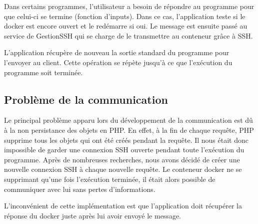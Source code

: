 \par Dans certains programmes, l'utilisateur a besoin de répondre au programme pour que celui-ci se termine (fonction d'inputs). Dans ce cas, l'application teste si le docker est encore ouvert et le redémarre si oui. Le message est ensuite passé au service de GestionSSH qui se charge de le transmettre au conteneur grâce à SSH.

\par L'application récupère de nouveau la sortie standard du programme pour l'envoyer au client. Cette opération se répète jusqu'à ce que l'exécution du programme soit terminée.

\subsection{Problème de la communication}

\par Le principal problème apparu lors du développement de la communication est dû à la non persistance des objets en PHP. En effet, à la fin de chaque requête, PHP supprime tous les objets qui ont été créés pendant la requête. Il nous était donc impossible de garder une connexion SSH ouverte pendant toute l'exécution du programme. Après de nombreuses recherches, nous avons décidé de créer une nouvelle connexion SSH à chaque nouvelle requête. Le conteneur docker ne se supprimant qu'une fois l'exécution terminée, il était alors possible de communiquer avec lui sans pertes d'informations.

\par L'inconvénient de cette implémentation est que l'application doit récupérer la réponse du docker juste après lui avoir envoyé le message.